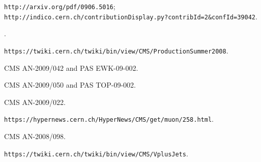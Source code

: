\begin{thebibliography}{99}

 {\tt http://arxiv.org/pdf/0906.5016}; \\
{\tt http://indico.cern.ch/contributionDisplay.py?contribId=2\&confId=39042}.

.

 {\tt https://twiki.cern.ch/twiki/bin/view/CMS/ProductionSummer2008}.

 CMS AN-2009/042 and PAS EWK-09-002.

 CMS AN-2009/050 and PAS TOP-09-002.

 CMS AN-2009/022.

 {\tt https://hypernews.cern.ch/HyperNews/CMS/get/muon/258.html}.

 CMS AN-2008/098.

 {\tt https://twiki.cern.ch/twiki/bin/view/CMS/VplusJets}.

\end{thebibliography}








